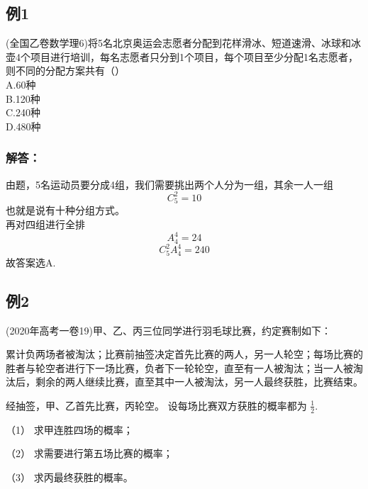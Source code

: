 
\begin{issues}
\issueDraft
\end{issues}
\subsection{例1}
(全国乙卷数学理6)将5名北京奥运会志愿者分配到花样滑冰、短道速滑、冰球和冰壶4个项目进行培训，每名志愿者只分到1个项目，每个项目至少分配1名志愿者，则不同的分配方案共有（）\\
A.60种\\
B.120种\\
C.240种\\
D.480种

\subsubsection{解答：}
由题，5名运动员要分成4组，我们需要挑出两个人分为一组，其余一人一组
\begin{equation}
C_5^2 = 10 
\end{equation}
也就是说有十种分组方式。\\
再对四组进行全排
\begin{equation}
A_4^4 = 24
\end{equation}
\begin{equation}
C_5^2A_4^4 =240 
\end{equation}
故答案选A.

\subsection{例2}
(2020年高考一卷19)甲、乙、丙三位同学进行羽毛球比赛，约定赛制如下：

累计负两场者被淘汰；比赛前抽签决定首先比赛的两人，另一人轮空；每场比赛的胜者与轮空者进行下一场比赛，负者下一轮轮空，直至有一人被淘汰；当一人被淘汰后，剩余的两人继续比赛，直至其中一人被淘汰，另一人最终获胜，比赛结束。

经抽签，甲、乙首先比赛，丙轮空。 设每场比赛双方获胜的概率都为 $\frac{1}{2}$.

（1）  求甲连胜四场的概率；

（2）  求需要进行第五场比赛的概率；

（3）  求丙最终获胜的概率。

